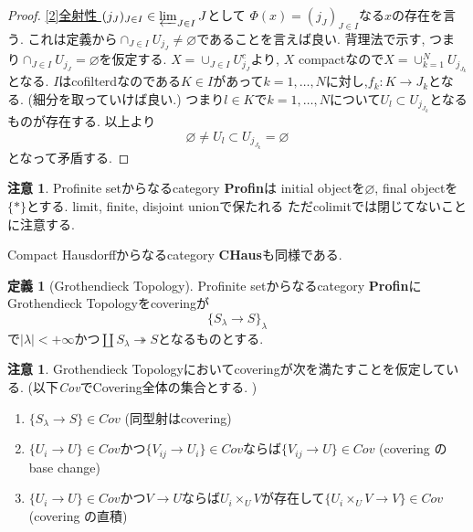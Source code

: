 \documentclass[dvipdfmx,a4paper,11pt]{article}
\theoremstyle{definition}
\newtheorem{dfn}[thm]{定義}
\newtheorem{rem}[thm]{注意}
\begin{document}
\begin{proof}
\underline{[2]全射性 }
$(j_{J})_{J \in I} \in \varprojlim_{J \in I} J$として
$\Phi(x) = (j_J)_{J \in I}$なる$x$の存在を言う.
これは定義から$\cap_{J \in I} U_{j_{J}} \neq \varnothing$であることを言えば良い.
背理法で示す, つまり$\cap_{J \in I} U_{j_{J}} = \varnothing$を仮定する.
$X = \cup_{J \in I} U_{j_{J}}^{c} $より, $X$ compactなので$X =\cup_{k=1}^{N}U_{j_{J_{k}}}$となる.
 $I$はcofilterdなのである$K \in I$があって$k = 1, \ldots, N$に対し,$f_{k} : K \to J_k$となる. (細分を取っていけば良い.)
つまり$l \in K$で$k = 1, \ldots, N$について$U_l\subset U_{j_{J_{k}}}$となるものが存在する.
以上より
 $$
\varnothing \neq U_l\subset U_{j_{J_{k}}} = \varnothing
 $$
 となって矛盾する.
\end{proof}

\begin{rem}
Profinite setからなるcategory {\bf Profin}は
initial objectを$\varnothing$, final objectを$\{ \ast\}$とする.
limit, finite, disjoint unionで保たれる
ただcolimitでは閉じてないことに注意する. 

Compact Hausdorffからなるcategory {\bf CHaus}も同様である. 
\end{rem}

\begin{tcolorbox}
 [colback = white, colframe = green!35!black, fonttitle = \bfseries,breakable = true]
\begin{dfn}[Grothendieck Topology]
Profinite setからなるcategory {\bf Profin}にGrothendieck Topologyをcoveringが
$$
\{ S_{\lambda} \to S\}_{\lambda}
$$ 
で$|\lambda| < + \infty$かつ$\coprod S_{\lambda} \twoheadrightarrow S$となるものとする.
\end{dfn}
 \end{tcolorbox}
 \begin{rem}
 Grothendieck Topologyにおいてcoveringが次を満たすことを仮定している. (以下\textit{Cov}でCovering全体の集合とする. )
 \begin{enumerate}
 \item $ \{ S_{\lambda} \to S\} \in \textit{Cov}$ (同型射はcovering)
 \item $\{U_i \to U\}\in \textit{Cov}$かつ$\{V_{ij} \to U_{i}\}\in \textit{Cov}$ならば$\{ V_{ij} \to U\} \in \textit{Cov}$ (covering のbase change)
 \item $\{U_i \to U\}\in \textit{Cov}$かつ$V \to U$ならば$U_{i} \times_{U}V$が存在して$\{ U_{i} \times_{U}V \to V\} \in \textit{Cov}$ (covering の直積)
 \end{enumerate} 
 \end{rem}
\end{document}
